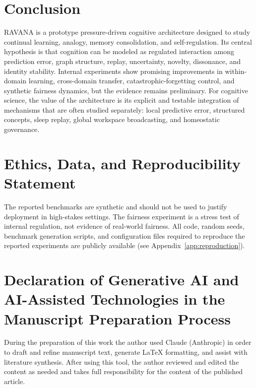 \documentclass[11pt]{article}
\begin{document}
\section{Conclusion}
RAVANA is a prototype pressure-driven cognitive architecture designed to study continual learning, analogy, memory consolidation, and self-regulation. Its central hypothesis is that cognition can be modeled as regulated interaction among prediction error, graph structure, replay, uncertainty, novelty, dissonance, and identity stability. Internal experiments show promising improvements in within-domain learning, cross-domain transfer, catastrophic-forgetting control, and synthetic fairness dynamics, but the evidence remains preliminary. For cognitive science, the value of the architecture is its explicit and testable integration of mechanisms that are often studied separately: local predictive error, structured concepts, sleep replay, global workspace broadcasting, and homeostatic governance.

\section*{Ethics, Data, and Reproducibility Statement}
The reported benchmarks are synthetic and should not be used to justify deployment in high-stakes settings. The fairness experiment is a stress test of internal regulation, not evidence of real-world fairness. All code, random seeds, benchmark generation scripts, and configuration files required to reproduce the reported experiments are publicly available (see Appendix~\ref{app:reproduction}).

\section*{Declaration of Generative AI and AI-Assisted Technologies in the Manuscript Preparation Process}
During the preparation of this work the author used Claude (Anthropic) in order to draft and refine manuscript text, generate \LaTeX{} formatting, and assist with literature synthesis. After using this tool, the author reviewed and edited the content as needed and takes full responsibility for the content of the published article.
\end{document}
